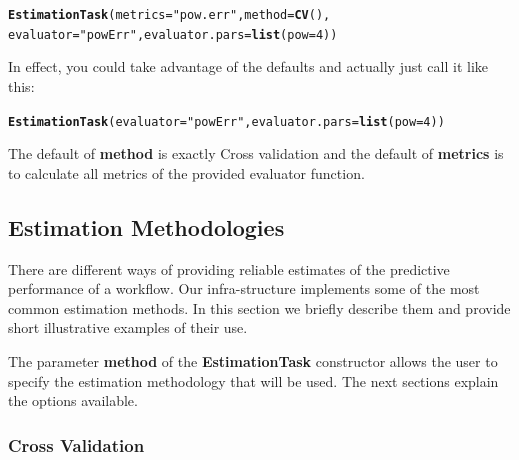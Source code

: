 \documentclass[10pt,a4paper]{article}\usepackage[]{graphicx}\usepackage[]{color}
\makeatletter
\newcommand{\hlnum}[1]{\textcolor[rgb]{0.686,0.059,0.569}{#1}}%
\newcommand{\hlstr}[1]{\textcolor[rgb]{0.192,0.494,0.8}{#1}}%
\newcommand{\hlstd}[1]{\textcolor[rgb]{0.345,0.345,0.345}{#1}}%
\newcommand{\hlkwc}[1]{\textcolor[rgb]{0.333,0.667,0.333}{#1}}%
\newcommand{\hlkwd}[1]{\textcolor[rgb]{0.737,0.353,0.396}{\textbf{#1}}}%
\newenvironment{kframe}{%
 \def\at@end@of@kframe{}%
 \ifinner\ifhmode%
  \def\at@end@of@kframe{\end{minipage}}%
  \begin{minipage}{\columnwidth}%
 \fi\fi%
 \def\FrameCommand##1{\hskip\@totalleftmargin \hskip-\fboxsep
 \colorbox{shadecolor}{##1}\hskip-\fboxsep
     \hskip-\linewidth \hskip-\@totalleftmargin \hskip\columnwidth}%
 \MakeFramed {\advance\hsize-\width
   \@totalleftmargin\z@ \linewidth\hsize
   \@setminipage}}%
 {\par\unskip\endMakeFramed%
 \at@end@of@kframe}
\newenvironment{knitrout}{}{} %
\makeatother
\begin{document}
\begin{knitrout}\footnotesize
{}\color{fgcolor}\begin{kframe}
\begin{alltt}
\hlkwd{EstimationTask}\hlstd{(}\hlkwc{metrics}\hlstd{=}\hlstr{"pow.err"}\hlstd{,}\hlkwc{method}\hlstd{=}\hlkwd{CV}\hlstd{(),}
               \hlkwc{evaluator}\hlstd{=}\hlstr{"powErr"}\hlstd{,}\hlkwc{evaluator.pars}\hlstd{=}\hlkwd{list}\hlstd{(}\hlkwc{pow}\hlstd{=}\hlnum{4}\hlstd{))}
\end{alltt}
\end{kframe}
\end{knitrout}

In effect, you could take advantage of the defaults and actually just call it like this:

\begin{knitrout}\footnotesize
{}\color{fgcolor}\begin{kframe}
\begin{alltt}
\hlkwd{EstimationTask}\hlstd{(}\hlkwc{evaluator}\hlstd{=}\hlstr{"powErr"}\hlstd{,}\hlkwc{evaluator.pars}\hlstd{=}\hlkwd{list}\hlstd{(}\hlkwc{pow}\hlstd{=}\hlnum{4}\hlstd{))}
\end{alltt}
\end{kframe}
\end{knitrout}

The default of \textbf{method} is exactly Cross validation and the default of \textbf{metrics} is to calculate all metrics of the provided evaluator function.

\subsection{Estimation Methodologies}\label{sec:expMeth}

There are different ways of providing reliable estimates of the
predictive performance of a workflow. Our infra-structure implements some
of the most common estimation methods. In this section we
briefly describe them and provide short illustrative examples of their
use.

The parameter \textbf{method} of the \textbf{EstimationTask} constructor allows the user to specify the estimation methodology that will be used. The next sections explain the options available.

\subsubsection{Cross Validation}
\end{document}
